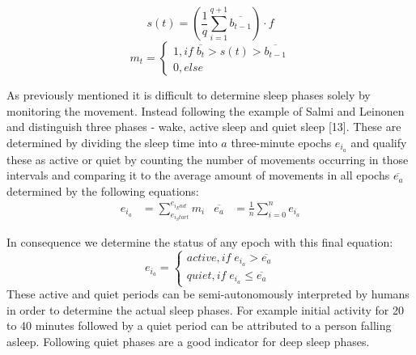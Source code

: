 \begin{equation}
s(t)=\left ( \frac{1}{q}\sum_{i=1}^{q+1}{\overline{b_{t-1}}} \right )\cdot f
\end{equation}
\begin{equation}
m_t=\left\{\begin{matrix}
1,if \; \overline{b_t}> s(t)>\overline{b_{{t-1}}}\\ 
0,else
\end{matrix}\right.
\end{equation}

As previously mentioned it is difficult to determine sleep phases solely by monitoring the movement. Instead following the example of Salmi and Leinonen and distinguish three phases - wake, active sleep and quiet sleep [13]. These are determined by dividing the sleep time into $a$ three-minute epochs $e_{i_a}$ and qualify these as active or quiet by counting the number of movements occurring in those intervals and comparing it to the average amount of movements in all epochs $\overline{e_a}$ determined by the following equations:
\begin{align}
e_{i_a}&=\sum_{e_{i_Start}}^{e_{i_End}}{m_i} & \overline{e_a}&=\frac{1}{n}\sum_{i=0}^n{e_{i_a}}
\end{align}

In consequence we determine the status of any epoch with this final equation:
\begin{equation}
e_{i_a}=\left\{\begin{matrix}
active,if \; e_{i_a}>\overline{e_a}\\ 
quiet,if \; e_{i_a}\leq \overline{e_a}
\end{matrix}\right.
\end{equation}
These active and quiet periods can be semi-autonomously interpreted by humans in order to determine the actual sleep phases. For example initial activity for 20 to 40 minutes followed by a quiet period can be attributed to a person falling asleep. Following quiet phases are a good indicator for deep sleep phases.
 
